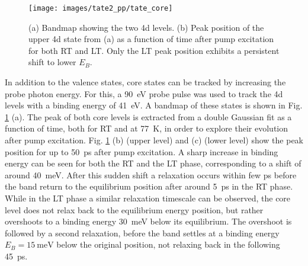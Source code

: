 \begin{figure}[t!]
	\centering
	\texttt{[image: images/tate2\_pp/tate\_core]}
	\caption{(a) Bandmap showing the two  4d levels. (b) Peak position of the upper 4d state from (a) as a function of time after pump excitation for both RT and LT. Only the LT peak position exhibits a persistent shift to lower $E_B$.}
	\label{fig:tate_core}
\end{figure}


In addition to the valence states, core states can be tracked by increasing the probe photon energy.
For this, a \qty{90}{\electronvolt} probe pulse was used to track the  4d levels with a binding energy of \qty{41}{\electronvolt}.
A bandmap of these states is shown in Fig. \ref{fig:tate_core} (a).
The peak of both core levels is extracted from a double Gaussian fit as a function of time, both for RT and at \qty{77}{\kelvin}, in order to explore their evolution after pump excitation.
Fig. \ref{fig:tate_core} (b) (upper level) and (c) (lower level) show the peak position for up to \qty{50}{\pico\second} after pump excitation.
A sharp increase in binding energy can be seen for both the RT and the LT phase, corresponding to a shift of around \qty{40}{\milli\electronvolt}.
After this sudden shift a relaxation occurs within few \unit{\pico\second} before the band return to the equilibrium position after around \qty{5}{\pico\second} in the RT phase.
While in the LT phase a similar relaxation timescale can be observed, the core level does not relax back to the equilibrium energy position, but rather overshoots to a binding energy \qty{30}{\milli\electronvolt} below its equilibrium.
The overshoot is followed by a second relaxation, before the band settles at a binding energy $E_B=\qty{15}{\milli\electronvolt}$ below the original position, not relaxing back in the following \qty{45}{\pico\second}.


